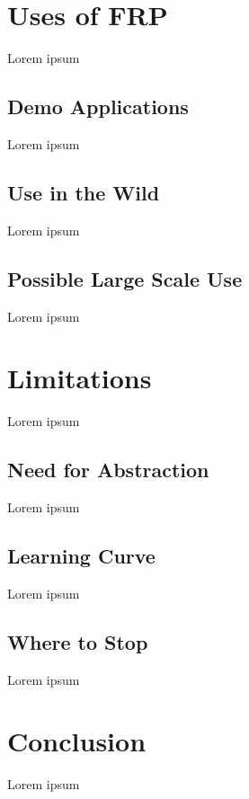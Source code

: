 \documentclass[12pt]{article}
\begin{document}
  \section{Uses of FRP}
  Lorem ipsum
  
    \subsection{Demo Applications}
    Lorem ipsum
    
    \subsection{Use in the Wild}
    Lorem ipsum
    
    \subsection{Possible Large Scale Use}
    Lorem ipsum
    
  \section{Limitations}
    Lorem ipsum
    
    \subsection{Need for Abstraction}
    Lorem ipsum
    
    \subsection{Learning Curve}
    Lorem ipsum
    
    \subsection{Where to Stop}
    Lorem ipsum
    
  \section{Conclusion}
  Lorem ipsum
  
\end{document}
